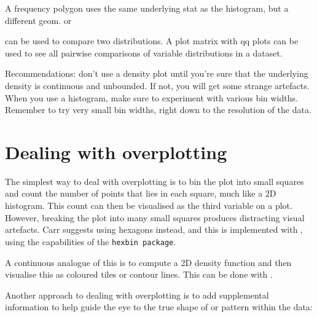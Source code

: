 A frequency polygon uses the same underlying stat as the histogram, but a different geom.   or 

 can be used to compare two distributions.  A plot matrix with qq plots can be used to see all pairwise comparisons of variable distributions in a dataset.

Recommendations:  don't use a density plot until you're sure that the underlying density is continuous and unbounded.  If not, you will get some strange artefacts.  When you use a histogram, make sure to experiment with various bin widths.  Remember to try very small bin widths, right down to the resolution of the data.  

% 
% 
%   
% 
% 

\section{Dealing with overplotting}
\label{sec:overplotting}

The simplest way to deal with overplotting is to bin the plot into small squares and count the number of points that lies in each square, much like a 2D histogram.  This count can then be visualised as the third variable on a plot.  However, breaking the plot into many small squares produces distracting visual artefacts.  Carr \citep{carr:1987} suggests using hexagons instead, and this is implemented with , using the capabilities of the {\tt hexbin package}.

A continuous analogue of this is to compute a 2D density function and then visualise this as coloured tiles or contour lines.  This can be done with .

Another approach to dealing with overplotting is to add supplemental information to help guide the eye to the true shape of or pattern within the data:

